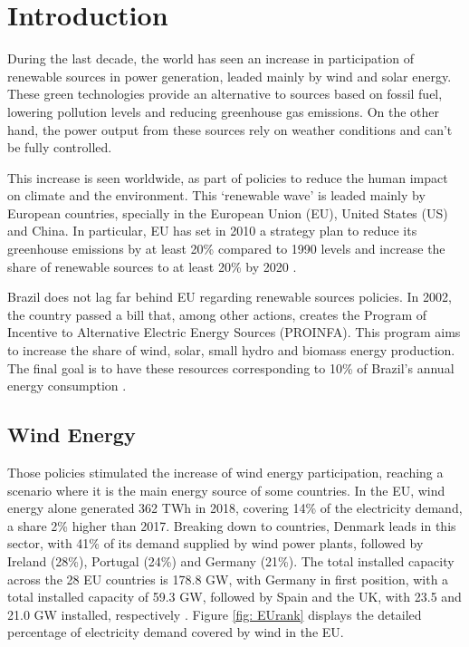 
\chapter[Introduction]{Introduction}

During the last decade, the world has seen an increase in participation of renewable sources in power generation, leaded mainly by wind and solar energy. These green technologies provide an alternative to sources based on fossil fuel, lowering pollution levels and reducing greenhouse gas emissions. On the other hand, the power output from these sources rely on weather conditions and can't be fully controlled.

This increase is seen worldwide, as part of policies to reduce the human impact on climate and the environment. This `renewable wave' is leaded mainly by European countries, specially in the European Union (EU), United States (US) and China. In particular, EU has set in 2010 a strategy plan to reduce its greenhouse emissions by at least 20\% compared to 1990 levels and increase the share of renewable sources to at least 20\% by 2020 \cite{Europe2020}.

Brazil does not lag far behind EU regarding renewable sources policies. In 2002, the country passed a bill that, among other actions, creates the Program of Incentive to Alternative Electric Energy Sources (PROINFA). This program aims to increase the share of wind, solar, small hydro and biomass energy production. The final goal is to have these resources corresponding to 10\% of Brazil's annual energy consumption \cite{Brazil2002}.

\section{Wind Energy}

Those policies stimulated the increase of wind energy participation, reaching a scenario where it is the main energy source of some countries. In the EU, wind energy alone generated 362 TWh in 2018, covering 14\% of the electricity demand, a share 2\% higher than 2017. Breaking down to countries, Denmark leads in this sector, with 41\% of its demand supplied by wind power plants, followed by Ireland (28\%), Portugal (24\%) and Germany (21\%). The total installed capacity across the 28 EU countries is 178.8 GW, with Germany in first position, with a total installed capacity of 59.3 GW, followed by Spain and the UK, with 23.5 and 21.0 GW installed, respectively \cite{WindEurope2019}. Figure \ref{fig: EUrank} displays the detailed percentage of electricity demand covered by wind in the EU.

